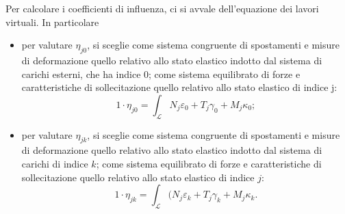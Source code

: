 Per calcolare i coefficienti di influenza, ci si avvale dell’equazione dei lavori virtuali. In particolare
\begin{itemize}
	\item per valutare $\eta_{j0}$, si sceglie come sistema congruente di spostamenti e misure di deformazione quello relativo allo stato elastico indotto dal sistema di carichi esterni, che ha indice 0; come sistema equilibrato di forze e caratteristiche di sollecitazione quello relativo allo stato elastico di indice j:
	\begin{equation}
		1\cdot\eta_{j0}=\int_{\mathcal{L}}N_j\varepsilon_0+T_j\gamma_0+M_j\kappa_0;
	\end{equation}
\item per valutare  $\eta_{jk}$, si sceglie come sistema congruente di spostamenti e misure di deformazione quello relativo allo stato elastico indotto dal sistema di carichi di indice $k$; come sistema equilibrato di forze e caratteristiche di sollecitazione quello relativo allo stato elastico di indice $j$:
\begin{equation}
	1\cdot\eta_{jk}=\int_{\mathcal{L}}(N_j\varepsilon_k+T_j\gamma_k+M_j\kappa_k.
\end{equation}
\end{itemize}


